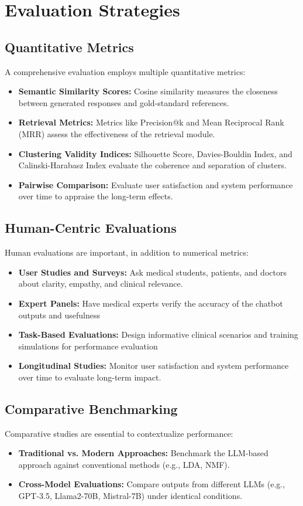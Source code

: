 \section{Evaluation Strategies}

\subsection{Quantitative Metrics}
A comprehensive evaluation employs multiple quantitative metrics:
\begin{itemize}[itemsep=2em]
    \item \textbf{Semantic Similarity Scores:} Cosine similarity measures the closeness between generated responses and gold-standard references.
    \item \textbf{Retrieval Metrics:} Metrics like Precision@k and Mean Reciprocal Rank (MRR) assess the effectiveness of the retrieval module.
    \item \textbf{Clustering Validity Indices:} Silhouette Score, Davies-Bouldin Index, and Calinski-Harabasz Index evaluate the coherence and separation of clusters.
    \item \textbf{Pairwise Comparison:} Evaluate user satisfaction and system performance over time to appraise the long-term effects.
\end{itemize}

\subsection{Human-Centric Evaluations}
Human evaluations are important, in addition to numerical metrics:
\begin{itemize}[itemsep=2em]
    \item \textbf{User Studies and Surveys:} Ask medical students, patients, and doctors about clarity, empathy, and clinical relevance.
    \item \textbf{Expert Panels:} Have medical experts verify the accuracy of the chatbot outputs and usefulness
    \item \textbf{Task-Based Evaluations:} Design informative clinical scenarios and training simulations for performance evaluation
    \item \textbf{Longitudinal Studies:} Monitor user satisfaction and system performance over time to evaluate long-term impact.
\end{itemize}

\subsection{Comparative Benchmarking}
Comparative studies are essential to contextualize performance:
\begin{itemize}[itemsep=2em]
    \item \textbf{Traditional vs. Modern Approaches:} Benchmark the LLM-based approach against conventional methods (e.g., LDA, NMF).
    \item \textbf{Cross-Model Evaluations:} Compare outputs from different LLMs (e.g., GPT-3.5, Llama2-70B, Mistral-7B) under identical conditions.
\end{itemize}

